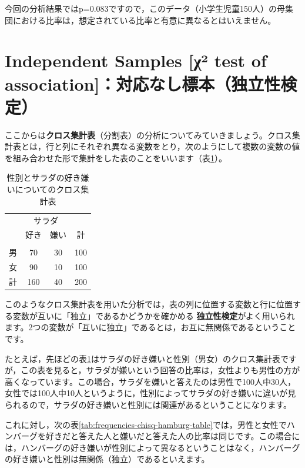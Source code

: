 \documentclass[
  12pt,
  a5jpaper,
  lualatex, ja=standard]{bxjsbook}
\renewcommand{\emph}[1]{\textbf{\color{emph} #1}}
\begin{document}
今回の分析結果ではp=0.083ですので，このデータ（小学生児童150人）の母集団における比率は，想定されている比率と有意に異なるとはいえません。

\hypertarget{sec:frequencies-chisq}{%
\section{Independent Samples {[}χ² test of association{]}：対応なし標本（独立性検定）}\label{sec:frequencies-chisq}}

ここからは\textbf{クロス集計表}（分割表）の分析についてみていきましょう。クロス集計表とは，行と列にそれぞれ異なる変数をとり，次のようにして複数の変数の値を組み合わせた形で集計をした表のことをいいます（表\ref{tab:frequencies-chisq-salad-table}）。

\begin{table}[H]

\caption{\label{tab:frequencies-chisq-salad-table}性別とサラダの好き嫌いについてのクロス集計表}
\centering
\begin{tabular}[t]{lccc}
\toprule
\multicolumn{1}{c}{ } & \multicolumn{2}{c}{サラダ} & \multicolumn{1}{c}{ } \\
\cmidrule(l{3pt}r{3pt}){2-3}
  & 好き & 嫌い & 計\\
\midrule
\addlinespace[0.3em]
\multicolumn{4}{l}{\textbf{性別}}\\
\hspace{1em}男 & 70 & 30 & 100\\
\hspace{1em}女 & 90 & 10 & 100\\
計 & 160 & 40 & 200\\
\bottomrule
\end{tabular}
\end{table}

このようなクロス集計表を用いた分析では，表の列に位置する変数と行に位置する変数が互いに「独立」であるかどうかを確かめる\emph{独立性検定}がよく用いられます。2つの変数が「互いに独立」であるとは，お互に無関係であるということです。

たとえば，先ほどの表\ref{tab:frequencies-chisq-salad-table}はサラダの好き嫌いと性別（男女）のクロス集計表ですが，この表を見ると，サラダが嫌いという回答の比率は，女性よりも男性の方が高くなっています。この場合，サラダを嫌いと答えたのは男性で100人中30人，女性では100人中10人というように，性別によってサラダの好き嫌いに違いが見られるので，サラダの好き嫌いと性別には関連があるということになります。

これに対し，次の表\ref{tab:frequencies-chisq-hamburg-table}では，男性と女性でハンバーグを好きだと答えた人と嫌いだと答えた人の比率は同じです。この場合には，ハンバーグの好き嫌いが性別によって異なるということはなく，ハンバーグの好き嫌いと性別は無関係（独立）であるといえます。
\end{document}
